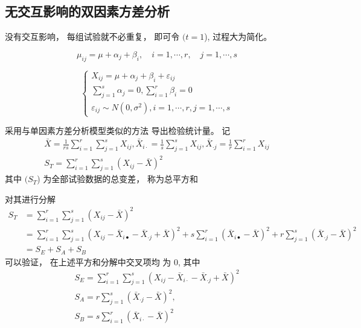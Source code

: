 \subsection{无交互影响的双因素方差分析}

没有交互影响， 每组试验就不必重复， 即可令 $( {t}={1} $),
过程大为简化。 

\begin{equation}
\mu_{i j}=\mu+\alpha_{j}+\beta_{i}, \quad i=1, \cdots, r, \quad j=1, \cdots, s
\end{equation}

\begin{equation} \left\{\begin{array}{l}X_{i j}=\mu+\alpha_{j}+\beta_{i}+\varepsilon_{i j} \\ \sum_{j=1}^{s} \alpha_{j}=0, \sum_{i=1}^{r} \beta_{i}=0 \\ \varepsilon_{i j} \sim N\left(0, \sigma^{2}\right), i=1, \cdots, r, j=1, \cdots, s\end{array}\right. \end{equation}

采用与单因素方差分析模型类似的方法 导出检验统计量。 
记
\begin{equation}
\begin{array}{c}
\bar{X}=\frac{1}{r s} \sum_{i=1}^{r} \sum_{j=1}^{s} X_{i j}, \bar{X}_{i \cdot}=\frac{1}{s} \sum_{j=1}^{s} X_{i j}, \bar{X}_{\cdot j}=\frac{1}{r} \sum_{i=1}^{r} X_{i j} \\
S_{T}=\sum_{i=1}^{r} \sum_{j=1}^{s}\left(X_{i j}-\bar{X}\right)^{2}
\end{array}
\end{equation}
其中 $( S_{T} $) 为全部试验数据的总变差， 称为总平方和

对其进行分解
\begin{equation}
\begin{aligned}
    S_{T}&=\sum_{i=1}^{r} \sum_{j=1}^{s}\left(X_{i j}-\bar{X}\right)^{2}\\ 
    &=\sum_{i=1}^{r} \sum_{j=1}^{s}\left(X_{i j}-\bar{X}_{i \bullet}-\bar{X}_{\cdot j}+\bar{X}\right)^{2}+s \sum_{i=1}^{r}\left(\bar{X}_{i \bullet}-\bar{X}\right)^{2}+r \sum_{j=1}^{s}\left(\bar{X}_{\cdot j}-\bar{X}\right)^{2} \\
    &=S_{E}+S_{A}+S_{B}
\end{aligned}
\end{equation}
可以验证， 在上述平方和分解中交叉项均
为 0, 其中
\begin{equation}
\begin{array}{c}
S_{E}=\sum_{i=1}^{r} \sum_{j=1}^{s}\left(X_{i j}-\bar{X}_{i \cdot}-\bar{X}_{\cdot j}+\bar{X}\right)^{2} \\
S_{A}=r \sum_{j=1}^{s}\left(\bar{X}_{\cdot j}-\bar{X}\right)^{2}, \\
S_{B}= s \sum_{i=1}^{r}\left(\bar{X}_{i \cdot}-\bar{X}\right)^{2}
\end{array}
\end{equation}

